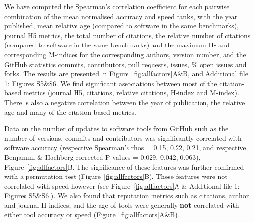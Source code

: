\documentclass{bmcart}
\begin{document}
We have computed the Spearman’s correlation coefficient for each
pairwise combination of the mean normalised accuracy and speed ranks,
with the year published, mean relative age (compared to software in the
same benchmarks), journal H5 metrics, the total number of citations,
the relative number of citations (compared to software in the same
benchmarks) and the maximum H- and corresponding M-indices for the corresponding
authors, version number,
{\color{red}and the GitHub statistics commits, contributors, pull requests, issues, \% open issues and forks}.
The results are presented in Figure~\ref{fig:allfactors}A\&B, and Additional file 1: Figures S5\&S6. We find
significant associations between most of the citation-based metrics
(journal H5, citations, relative citations, H-index and
M-index). There is also a negative correlation between the year of
publication, the relative age and many of the citation-based metrics.

Data on the number of updates to software tools from GitHub such as
the number of versions, commits and contributors was significantly
correlated with software accuracy (respective Spearman’s rhos =
{\color{black}0.15, 0.22, 0.21,} and respective Benjamini \& Hochberg
corrected P-values = {\color{black}0.029, 0.042, 0.063}),
Figure~\ref{fig:allfactors}B.  The significance of these features was
further confirmed with a permutation test
(Figure~\ref{fig:allfactors}B).  These features were not correlated
with speed however (see Figure~\ref{fig:allfactors}A {\color{red}\& Additional file 1: Figures S5\&S6}%
).  We also found that
reputation metrics such as citations, author and journal H-indices,
and the age of tools were generally \textbf{not} correlated with
either tool accuracy or speed (Figure~\ref{fig:allfactors}A\&B).


\end{document}
